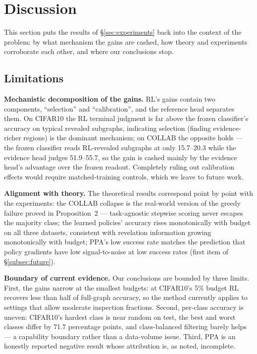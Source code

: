 \documentclass{article}
\begin{document}
\section{Discussion}
\label{sec:discussion}

This section puts the results of \S\ref{sec:experiments} back into the context of the problem: by what mechanism the gains are cashed, how theory and experiments corroborate each other, and where our conclusions stop.

\subsection{Limitations}
\label{subsec:limitations}

\textbf{Mechanistic decomposition of the gains.} RL's gains contain two components, ``selection'' and ``calibration'', and the reference head separates them. On CIFAR10 the RL terminal judgment is far above the frozen classifier's accuracy on typical revealed subgraphs, indicating selection (finding evidence-richer regions) is the dominant mechanism; on COLLAB the opposite holds --- the frozen classifier reads RL-revealed subgraphs at only 15.7--20.3 while the evidence head judges 51.9--55.7, so the gain is cashed mainly by the evidence head's advantage over the frozen readout. Completely ruling out calibration effects would require matched-training controls, which we leave to future work.

\textbf{Alignment with theory.} The theoretical results correspond point by point with the experiments: the COLLAB collapse is the real-world version of the greedy failure proved in Proposition~2 --- task-agnostic stepwise scoring never escapes the majority class; the learned policies' accuracy rises monotonically with budget on all three datasets, consistent with revelation information growing monotonically with budget; PPA's low success rate matches the prediction that policy gradients have low signal-to-noise at low success rates (first item of \S\ref{subsec:future}).

\textbf{Boundary of current evidence.} Our conclusions are bounded by three limits. First, the gains narrow at the smallest budgets: at CIFAR10's 5\% budget RL recovers less than half of full-graph accuracy, so the method currently applies to settings that allow moderate inspection fractions. Second, per-class accuracy is uneven: CIFAR10's hardest class is near random on test, the best and worst classes differ by 71.7 percentage points, and class-balanced filtering barely helps --- a capability boundary rather than a data-volume issue. Third, PPA is an honestly reported negative result whose attribution is, as noted, incomplete.
\end{document}
